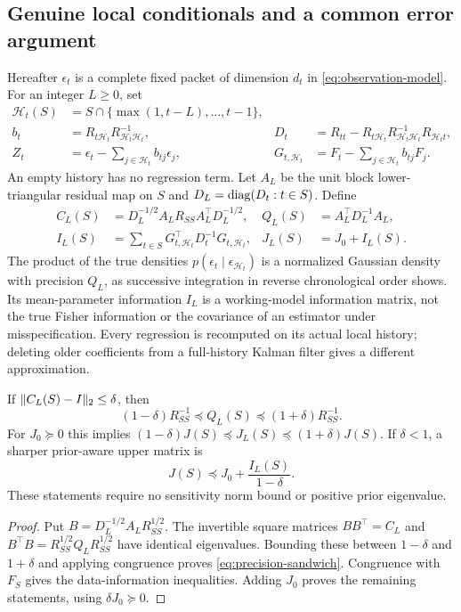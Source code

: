\subsection{Genuine local conditionals and a common error argument}
\label{subsec:local-conditionals}
Hereafter $\epsilon_t$ is a complete fixed packet of dimension $d_t$ in
\eqref{eq:observation-model}. For an integer $L\ge0$, set
\begin{align}
 \mathcal H_t(S)&=S\cap\{\max(1,t-L),\ldots,t-1\},\nonumber\\
 b_t&=R_{t\mathcal H_t}R_{\mathcal H_t\mathcal H_t}^{-1},&
 D_t&=R_{tt}-R_{t\mathcal H_t}R_{\mathcal H_t\mathcal H_t}^{-1}
                       R_{\mathcal H_t t},\nonumber\\
 Z_t&=\epsilon_t-\sum_{j\in\mathcal H_t}b_{tj}\epsilon_j,&
 G_{t,\mathcal H_t}&=F_t-\sum_{j\in\mathcal H_t}b_{tj}F_j.
 \label{eq:local-conditionals}
\end{align}
An empty history has no regression term. Let $A_L$ be the unit block
lower-triangular residual map on $S$ and $D_L=\operatorname{diag}(D_t:t\in S)$. Define
\begin{align}
 C_L(S)&=D_L^{-1/2}A_LR_{SS}A_L^\top D_L^{-1/2},&
 Q_L(S)&=A_L^\top D_L^{-1}A_L,\nonumber\\
 I_L(S)&=\sum_{t\in S}G_{t,\mathcal H_t}^\top D_t^{-1}G_{t,\mathcal H_t},&
 J_L(S)&=J_0+I_L(S).
 \label{eq:local-precision}
\end{align}
The product of the true densities $p(\epsilon_t\mid\epsilon_{\mathcal H_t})$
is a normalized Gaussian density with precision $Q_L$, as successive
integration in reverse chronological order shows. Its mean-parameter
information $I_L$ is a working-model information matrix, not the true
Fisher information or the covariance of an estimator under misspecification.
Every regression is recomputed on its actual local history; deleting older
coefficients from a full-history Kalman filter gives a different
approximation.

\begin{lemma}
\label{lem:residual-transfer}
If $\lVert C_L(S)-I\rVert_2\le\delta$, then
\begin{equation}
 (1-\delta)R_{SS}^{-1}\preceq Q_L(S)\preceq(1+\delta)R_{SS}^{-1}.
 \label{eq:precision-sandwich}
\end{equation}
For $J_0\succeq0$ this implies
$(1-\delta)J(S)\preceq J_L(S)\preceq(1+\delta)J(S)$.
If $\delta<1$, a sharper prior-aware upper matrix is
\begin{equation}
 J(S)\preceq J_0+\frac{I_L(S)}{1-\delta}.
 \label{eq:prior-aware-local}
\end{equation}
These statements require no sensitivity norm bound or positive prior eigenvalue.
\end{lemma}
\begin{proof}
Put $B=D_L^{-1/2}A_LR_{SS}^{1/2}$. The invertible square matrices
$BB^\top=C_L$ and $B^\top B=R_{SS}^{1/2}Q_LR_{SS}^{1/2}$ have identical
eigenvalues. Bounding these between $1-\delta$ and $1+\delta$ and applying
congruence proves \eqref{eq:precision-sandwich}. Congruence with $F_S$ gives
the data-information inequalities. Adding $J_0$ proves the remaining
statements, using $\delta J_0\succeq0$.
\end{proof}

